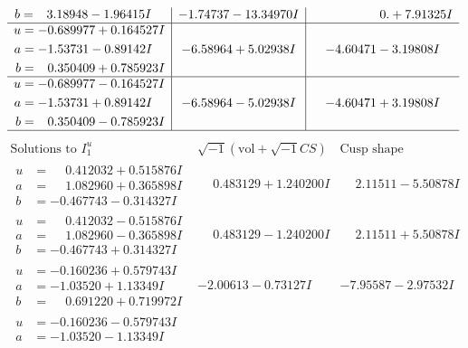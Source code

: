 \documentclass[1p]{elsarticle_modified}
\theoremstyle{definition}
\newcommand{\I}{\sqrt{-1}}
\begin{document}
$$\begin{array}{c|c|c}
\begin{aligned}
b &= \phantom{-}3.18948 - 1.96415 I\end{aligned}
 & -1.74737 - 13.34970 I & \phantom{-0.000000 -}0. + 7.91325 I \\ \hline\begin{aligned}
u &= -0.689977 + 0.164527 I \\
a &= -1.53731 - 0.89142 I \\
b &= \phantom{-}0.350409 + 0.785923 I\end{aligned}
 & -6.58964 + 5.02938 I & -4.60471 - 3.19808 I \\ \hline\begin{aligned}
u &= -0.689977 - 0.164527 I \\
a &= -1.53731 + 0.89142 I \\
b &= \phantom{-}0.350409 - 0.785923 I\end{aligned}
 & -6.58964 - 5.02938 I & -4.60471 + 3.19808 I\\
 \hline 
 \end{array}$$\newpage$$\begin{array}{c|c|c}  
\text{Solutions to }I^u_{1}& \I (\text{vol} + \sqrt{-1}CS) & \text{Cusp shape}\\
 \hline 
\begin{aligned}
u &= \phantom{-}0.412032 + 0.515876 I \\
a &= \phantom{-}1.082960 + 0.365898 I \\
b &= -0.467743 - 0.314327 I\end{aligned}
 & \phantom{-}0.483129 + 1.240200 I & \phantom{-}2.11511 - 5.50878 I \\ \hline\begin{aligned}
u &= \phantom{-}0.412032 - 0.515876 I \\
a &= \phantom{-}1.082960 - 0.365898 I \\
b &= -0.467743 + 0.314327 I\end{aligned}
 & \phantom{-}0.483129 - 1.240200 I & \phantom{-}2.11511 + 5.50878 I \\ \hline\begin{aligned}
u &= -0.160236 + 0.579743 I \\
a &= -1.03520 + 1.13349 I \\
b &= \phantom{-}0.691220 + 0.719972 I\end{aligned}
 & -2.00613 - 0.73127 I & -7.95587 - 2.97532 I \\ \hline\begin{aligned}
u &= -0.160236 - 0.579743 I \\
a &= -1.03520 - 1.13349 I \\

\end{aligned}
\end{array}$$
\end{document}

